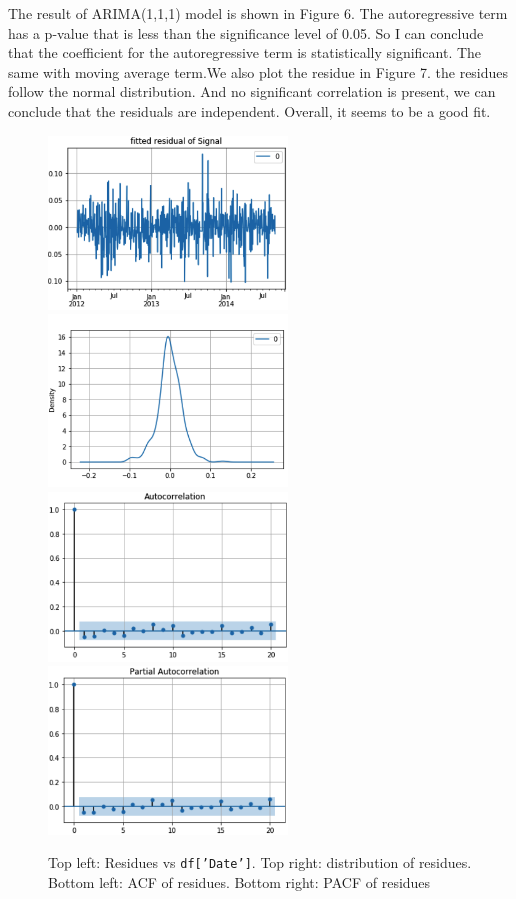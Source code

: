 \documentclass[11pt, oneside]{article}   	%
\begin{document}
The result of ARIMA(1,1,1) model is shown in Figure 6. The autoregressive term has a p-value that is less than the significance level of 0.05. So I can conclude that the coefficient for the autoregressive term is statistically significant. The same with moving average term.We also plot the residue in Figure 7. the residues follow the normal distribution. And no significant correlation is present, we can conclude that the residuals are independent. Overall, it seems to be a good fit. \begin{figure}[htbp]
   \centering
   \includegraphics[width = 2.5in]{re1.png} 
    \includegraphics[width = 2.5in]{re2.png}
    \includegraphics[width = 2.5in]{re3.png}
\includegraphics[width = 2.5in]{re4.png}
   \caption{Top left: Residues vs \texttt{df['Date']}.  Top right: distribution of residues. Bottom left: ACF of residues. Bottom right: PACF of residues}
\end{figure}
\end{document}
